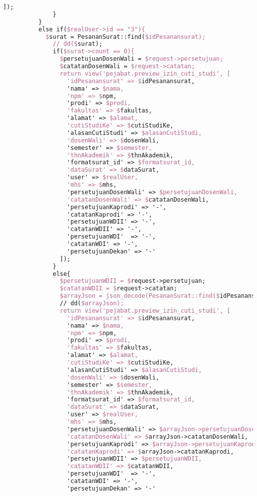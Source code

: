 \begin{lstlisting}[language=tex,basicstyle=\tiny,caption=PesanansuratController.php]
                ]);
              }
          }
          else if($realUser->id == "3"){
            $surat = PesananSurat::find($idPesanansurat);
              // dd($surat);
              if($surat->count == 0){
                $persetujuanDosenWali = $request->persetujuan;
                $catatanDosenWali = $request->catatan;
                return view('pejabat.preview_izin_cuti_studi', [
                  'idPesanansurat' => $idPesanansurat,
                  'nama' => $nama,
                  'npm' => $npm,
                  'prodi' => $prodi,
                  'fakultas' => $fakultas,
                  'alamat' => $alamat,
                  'cutiStudiKe' => $cutiStudiKe,
                  'alasanCutiStudi' => $alasanCutiStudi,
                  'dosenWali' => $dosenWali,
                  'semester' => $semester,
                  'thnAkademik' => $thnAkademik,
                  'formatsurat_id' => $formatsurat_id,
                  'dataSurat' => $dataSurat,
                  'user' => $realUser,
                  'mhs' => $mhs,
                  'persetujuanDosenWali' => $persetujuanDosenWali,
                  'catatanDosenWali' => $catatanDosenWali,
                  'persetujuanKaprodi' => '-',
                  'catatanKaprodi' => '-',
                  'persetujuanWDII' => '-',
                  'catatanWDII' => '-',
                  'persetujuanWDI'  => '-',
                  'catatanWDI' => '-',
                  'persetujuanDekan' => '-'
                ]);
              }
              else{
                $persetujuanWDII = $request->persetujuan;
                $catatanWDII = $request->catatan;
                $arrayJson = json_decode(PesananSurat::find($idPesanansurat)->dataSurat);
                // dd($arrayJson);
                return view('pejabat.preview_izin_cuti_studi', [
                  'idPesanansurat' => $idPesanansurat,
                  'nama' => $nama,
                  'npm' => $npm,
                  'prodi' => $prodi,
                  'fakultas' => $fakultas,
                  'alamat' => $alamat,
                  'cutiStudiKe' => $cutiStudiKe,
                  'alasanCutiStudi' => $alasanCutiStudi,
                  'dosenWali' => $dosenWali,
                  'semester' => $semester,
                  'thnAkademik' => $thnAkademik,
                  'formatsurat_id' => $formatsurat_id,
                  'dataSurat' => $dataSurat,
                  'user' => $realUser,
                  'mhs' => $mhs,
                  'persetujuanDosenWali' => $arrayJson->persetujuanDosenWali,
                  'catatanDosenWali' => $arrayJson->catatanDosenWali,
                  'persetujuanKaprodi' => $arrayJson->persetujuanKaprodi,
                  'catatanKaprodi' => $arrayJson->catatanKaprodi,
                  'persetujuanWDII' => $persetujuanWDII,
                  'catatanWDII' => $catatanWDII,
                  'persetujuanWDI'  => '-',
                  'catatanWDI' => '-',
                  'persetujuanDekan' => '-'


\end{lstlisting}

